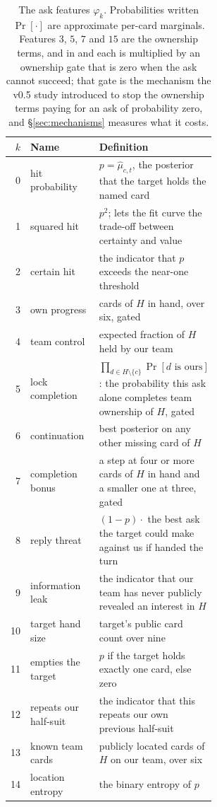 \begin{table}[ht]
\centering
\caption{The \numAskFeats{} ask features $\varphi_k$. Probabilities written
$\Pr[\cdot]$ are approximate per-card marginals. Features $3$, $5$, $7$ and $15$
are the ownership terms, and in \vfive{} and \vsix{} each is multiplied by an
ownership gate that is zero when the ask cannot succeed; that gate is the
mechanism the v0.5 study introduced to stop the ownership terms paying for an ask
of probability zero, and \S\ref{sec:mechanisms} measures what it costs.}
\label{tab:features}
\small
\begin{tabular}{rlp{0.58\linewidth}}
\toprule
$k$ & Name & Definition \\
\midrule
0  & hit probability     & $p = \hat\mu_{c,t}$, the posterior that the target holds the named card \\
1  & squared hit         & $p^2$; lets the fit curve the trade-off between certainty and value \\
2  & certain hit         & the indicator that $p$ exceeds the near-one threshold \\
3  & own progress        & cards of $H$ in hand, over six, gated \\
4  & team control        & expected fraction of $H$ held by our team \\
5  & lock completion     & $\prod_{d \in H \setminus \{c\}} \Pr[d \text{ is ours}]$: the probability this ask alone completes team ownership of $H$, gated \\
6  & continuation        & best posterior on any other missing card of $H$ \\
7  & completion bonus    & a step at four or more cards of $H$ in hand and a smaller one at three, gated \\
8  & reply threat        & $(1-p)\cdot$ the best ask the target could make against us if handed the turn \\
9  & information leak    & the indicator that our team has never publicly revealed an interest in $H$ \\
10 & target hand size    & target's public card count over nine \\
11 & empties the target  & $p$ if the target holds exactly one card, else zero \\
12 & repeats our half-suit & the indicator that this repeats our own previous half-suit \\
13 & known team cards    & publicly located cards of $H$ on our team, over six \\
14 & location entropy    & the binary entropy of $p$ \\

\end{tabular}
\end{table}
